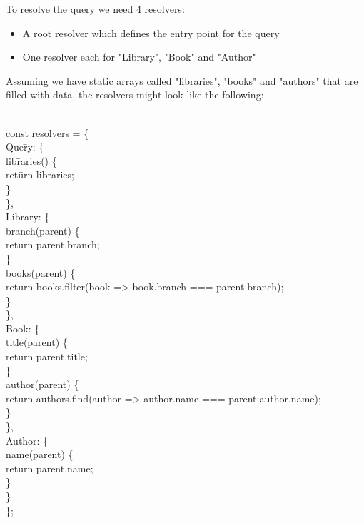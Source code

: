 \noindent
To resolve the query we need 4 resolvers:
\begin{itemize}
\item A root resolver which defines the entry point for the query
\item One resolver each for "Library", "Book" and "Author"
\end{itemize}

\noindent
Assuming we have static arrays called "libraries", "books" and "authors" that are filled with data, the resolvers might look like the following: 
\begin{exmp}
\label{ex244}
\begin{tabbing}
\\
con\=st resolvers = \{ \\
\> Que\=ry: \{ \\
\> \> lib\=raries() \{ \\
\> \> \> ret\=urn libraries; \\
\> \> \} \\
\> \}, \\
\> Library: \{ \\
\> \> branch(parent) \{ \\
\> \> \> return parent.branch; \\
\> \> \} \\
\> \> books(parent) \{ \\
\> \> \> return books.filter(book => book.branch === parent.branch); \\
\> \> \} \\
\> \}, \\
\> Book: \{ \\
\> \> title(parent) \{ \\
\> \> \> return parent.title; \\
\> \> \} \\
\> \> author(parent) \{ \\
\> \> \> return authors.find(author => author.name === parent.author.name); \\
\> \> \} \\
\> \}, \\
\> Author: \{ \\
\> \> name(parent) \{ \\
\> \> \> return parent.name; \\
\> \> \} \\
\> \} \\
\};
\end{tabbing}
\end{exmp}

